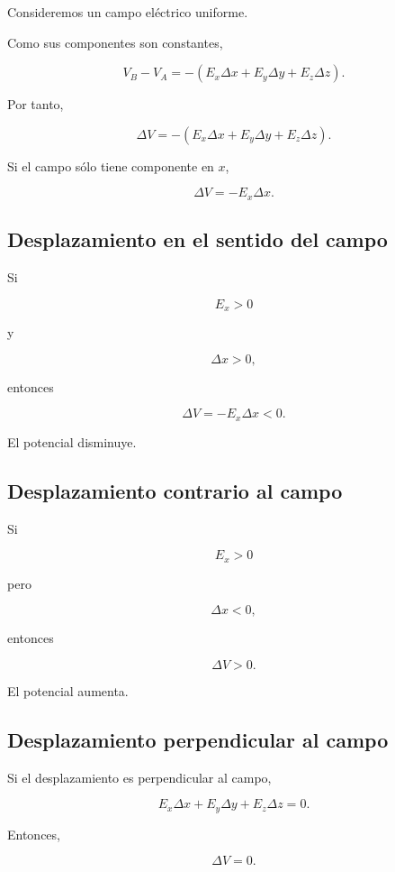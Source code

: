 Consideremos un campo eléctrico uniforme.

Como sus componentes son constantes,

\[
V_B-V_A
=
-
\left(
E_x\Delta x+
E_y\Delta y+
E_z\Delta z
\right).
\]

Por tanto,

\begin{equation}
\boxed{
\Delta V
=
-
\left(
E_x\Delta x+
E_y\Delta y+
E_z\Delta z
\right)
}.
\end{equation}

Si el campo sólo tiene componente en \(x\),

\begin{equation}
\boxed{
\Delta V=-E_x\Delta x
}.
\end{equation}


\subsection{Desplazamiento en el sentido del campo}

Si

\[
E_x>0
\]

y

\[
\Delta x>0,
\]

entonces

\[
\Delta V=-E_x\Delta x<0.
\]

El potencial disminuye.


\subsection{Desplazamiento contrario al campo}

Si

\[
E_x>0
\]

pero

\[
\Delta x<0,
\]

entonces

\[
\Delta V>0.
\]

El potencial aumenta.


\subsection{Desplazamiento perpendicular al campo}

Si el desplazamiento es perpendicular al campo,

\[
E_x\Delta x+E_y\Delta y+E_z\Delta z=0.
\]

Entonces,

\begin{equation}
\boxed{\Delta V=0}.
\end{equation}

